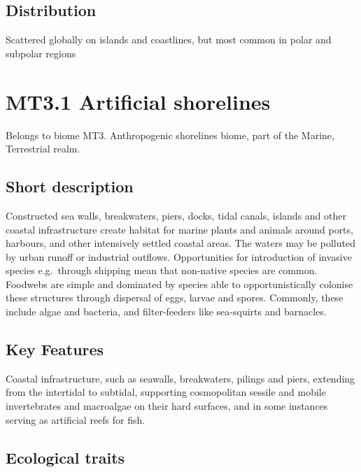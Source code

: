 \documentclass[
  letterpaper,
  DIV=11,
  numbers=noendperiod]{scrartcl}
\begin{document}
\subsection{Distribution}\label{distribution-57}

Scattered globally on islands and coastlines, but most common in polar
and subpolar regions

\section{MT3.1 Artificial shorelines}\label{mt3.1-artificial-shorelines}

Belongs to biome MT3. Anthropogenic shorelines biome, part of the
Marine, Terrestrial realm.

\subsection{Short description}\label{short-description-58}

Constructed sea walls, breakwaters, piers, docks, tidal canals, islands
and other coastal infrastructure create habitat for marine plants and
animals around ports, harbours, and other intensively settled coastal
areas. The waters may be polluted by urban runoff or industrial
outflows. Opportunities for introduction of invasive species
e.g.~through shipping mean that non-native species are common. Foodwebs
are simple and dominated by species able to opportunistically colonise
these structures through dispersal of eggs, larvae and spores. Commonly,
these include algae and bacteria, and filter-feeders like sea-squirts
and barnacles.

\subsection{Key Features}\label{key-features-58}

Coastal infrastructure, such as seawalls, breakwaters, pilings and
piers, extending from the intertidal to subtidal, supporting
cosmopolitan sessile and mobile invertebrates and macroalgae on their
hard surfaces, and in some instances serving as artificial reefs for
fish.

\subsection{Ecological traits}\label{ecological-traits-58}
\end{document}

